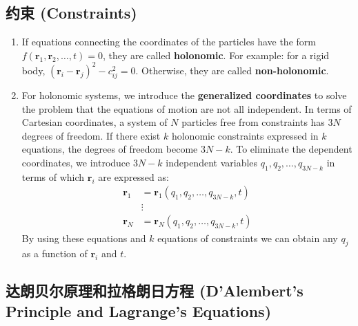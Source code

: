 \documentclass[12pt,a4paper]{article}
\theoremstyle{definition}
\theoremstyle{remark}
\renewcommand{\vec}[1]{\mathbf{#1}}
\begin{document}
	\subsection{约束 (Constraints)}
	\begin{enumerate}
		\item If equations connecting the coordinates of the particles have the form $f(\vec{r}_1, \vec{r}_2, \dots, t) = 0$, they are called \textbf{holonomic}.
		For example: for a rigid body, $(\vec{r}_i - \vec{r}_j)^2 - c_{ij}^2 = 0$.
		Otherwise, they are called \textbf{non-holonomic}.
		
		\item For holonomic systems, we introduce the \textbf{generalized coordinates} to solve the problem that the equations of motion are not all independent.
		In terms of Cartesian coordinates, a system of $N$ particles free from constraints has $3N$ degrees of freedom. If there exist $k$ holonomic constraints expressed in $k$ equations, the degrees of freedom become $3N-k$.
		To eliminate the dependent coordinates, we introduce $3N-k$ independent variables $q_1, q_2, \dots, q_{3N-k}$ in terms of which $\vec{r}_i$ are expressed as:
		\begin{align*}
			\vec{r}_1 &= \vec{r}_1(q_1, q_2, \dots, q_{3N-k}, t) \\
			&\vdots \\
			\vec{r}_N &= \vec{r}_N(q_1, q_2, \dots, q_{3N-k}, t)
		\end{align*}
		By using these equations and $k$ equations of constraints we can obtain any $q_j$ as a function of $\vec{r}_i$ and $t$.
	\end{enumerate}
	
	\subsection{达朗贝尔原理和拉格朗日方程 (D'Alembert's Principle and Lagrange's Equations)}
	
\end{document}
